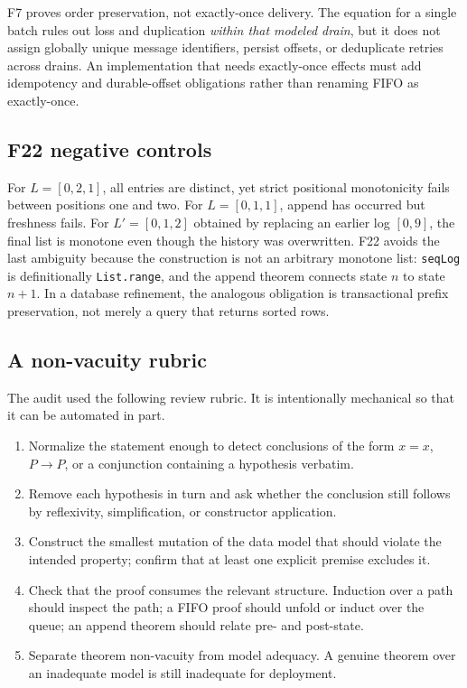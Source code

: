 \documentclass[11pt,letterpaper]{article}
\theoremstyle{definition}
\begin{document}
F7 proves order preservation, not exactly-once delivery. The equation for a
single batch rules out loss and duplication \emph{within that modeled drain},
but it does not assign globally unique message identifiers, persist offsets, or
deduplicate retries across drains. An implementation that needs exactly-once
effects must add idempotency and durable-offset obligations rather than
renaming FIFO as exactly-once.

\subsection{F22 negative controls}

For $L=[0,2,1]$, all entries are distinct, yet strict positional monotonicity
fails between positions one and two. For $L=[0,1,1]$, append has occurred but
freshness fails. For $L'=[0,1,2]$ obtained by replacing an earlier log
$[0,9]$, the final list is monotone even though the history was overwritten.
F22 avoids the last ambiguity because the construction is not an arbitrary
monotone list: \texttt{seqLog} is definitionally \texttt{List.range}, and the
append theorem connects state $n$ to state $n+1$. In a database refinement, the
analogous obligation is transactional prefix preservation, not merely a query
that returns sorted rows.

\subsection{A non-vacuity rubric}

The audit used the following review rubric. It is intentionally mechanical so
that it can be automated in part.

\begin{enumerate}
\item Normalize the statement enough to detect conclusions of the form $x=x$,
$P\to P$, or a conjunction containing a hypothesis verbatim.
\item Remove each hypothesis in turn and ask whether the conclusion still
follows by reflexivity, simplification, or constructor application.
\item Construct the smallest mutation of the data model that should violate the
intended property; confirm that at least one explicit premise excludes it.
\item Check that the proof consumes the relevant structure. Induction over a
path should inspect the path; a FIFO proof should unfold or induct over the
queue; an append theorem should relate pre- and post-state.
\item Separate theorem non-vacuity from model adequacy. A genuine theorem over
an inadequate model is still inadequate for deployment.
\end{enumerate}
\end{document}
